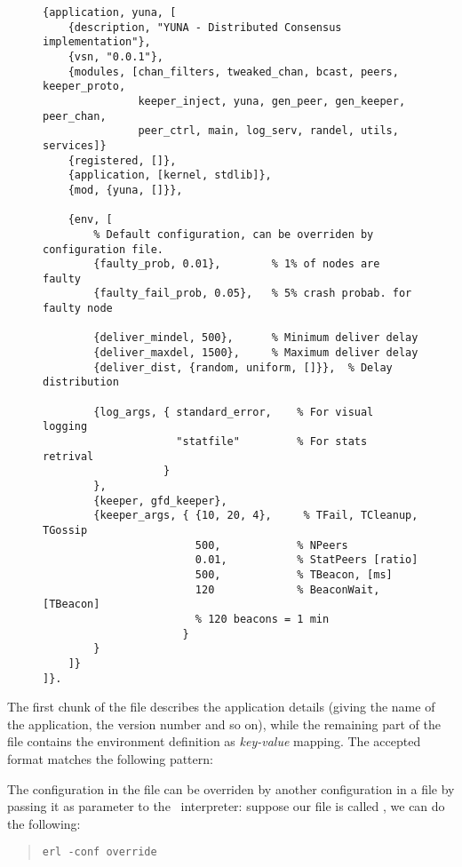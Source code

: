 \begin{figure}[hbt]
\begin{lstlisting}[label={code:ConfFile},
                   caption={default configuration file}]
{application, yuna, [
    {description, "YUNA - Distributed Consensus implementation"},
    {vsn, "0.0.1"},
    {modules, [chan_filters, tweaked_chan, bcast, peers, keeper_proto,
               keeper_inject, yuna, gen_peer, gen_keeper, peer_chan,
               peer_ctrl, main, log_serv, randel, utils, services]}
    {registered, []},
    {application, [kernel, stdlib]},
    {mod, {yuna, []}},

    {env, [
        % Default configuration, can be overriden by configuration file.
        {faulty_prob, 0.01},        % 1% of nodes are faulty
        {faulty_fail_prob, 0.05},   % 5% crash probab. for faulty node

        {deliver_mindel, 500},      % Minimum deliver delay
        {deliver_maxdel, 1500},     % Maximum deliver delay
        {deliver_dist, {random, uniform, []}},  % Delay distribution

        {log_args, { standard_error,    % For visual logging
                     "statfile"         % For stats retrival
                   }
        },
        {keeper, gfd_keeper},
        {keeper_args, { {10, 20, 4},     % TFail, TCleanup, TGossip
                        500,            % NPeers
                        0.01,           % StatPeers [ratio]
                        500,            % TBeacon, [ms]
                        120             % BeaconWait, [TBeacon]
                        % 120 beacons = 1 min
                      }
        }
    ]}
]}.
\end{lstlisting}
\end{figure}

The first chunk of the file describes the application details (giving
the name of the application, the version number and so on), while the
remaining part of the file contains the environment definition as
\emph{key-value} mapping. The accepted format matches the following
pattern:

\begin{quote}
\centering
{}
\end{quote}

The configuration in the  file can be overriden by another
configuration in a  file by passing it as parameter to the
\Erlang\ interpreter: suppose our file is called , we
can do the following:
\begin{quote}
\begin{verbatim}
erl -conf override
\end{verbatim}
\end{quote}

